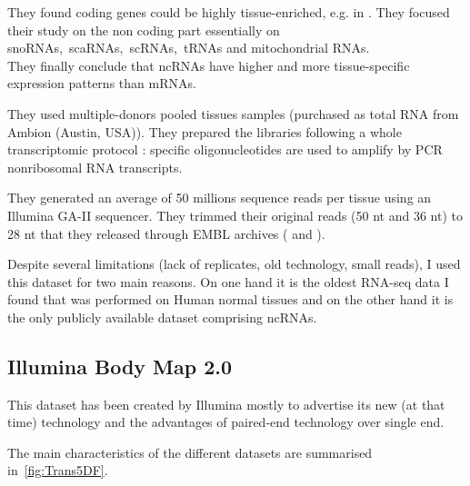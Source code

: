 They found coding genes could be highly tissue-enriched, e.g. 
in . They focused their study on the non coding part essentially
on \glspl{snoRNA},~\glspl{scaRNA},~\glspl{scRNA},~\glspl{tRNA} and mitochondrial
\glspl{RNA}.\\
They finally conclude that \glspl{ncRNA} have higher and more tissue-specific
expression patterns than \glspl{mRNA}.

They used multiple-donors pooled tissues samples (purchased as total \gls{RNA}
from Ambion (Austin, USA)).
They prepared the libraries following a whole transcriptomic protocol \citep{Armour:2009}:
specific oligonucleotides are used to amplify by \gls{PCR} nonribosomal \gls{RNA}
transcripts.

They generated an average of 50 millions sequence reads per tissue
using an Illumina GA-II sequencer. They trimmed their original reads (50 \gls{nt}
and 36 \gls{nt}) to 28 \gls{nt} that they released through EMBL archives (
and ).

Despite several limitations (lack of replicates, old technology, small reads),
I used this dataset for two main reasons. On one hand it is the oldest \gls{RNA-seq}
data I found that was performed on Human normal tissues and on the other hand it
is the only publicly available dataset comprising \glspl{ncRNA}.


\subsection{Illumina Body Map 2.0}

This dataset has been created by Illumina mostly to advertise its new (at that time)
technology and the advantages of paired-end technology over single end.
\citep{illuminaBM}


The main characteristics of the different datasets are summarised
in~\cref{fig:Trans5DF}.

